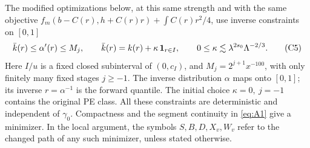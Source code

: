 The modified optimizations below, at this same strength and with the same objective \(f_m(b-C(r),h+C(r)r)+\int C(r)r^2/4\), use inverse constraints on \([0,1]\)
\[
 \bar k(r)\le\alpha'(r)\le M_j,\qquad
 \bar k(r)=k(r)+\kappa\,{\bf1}_{r\in I},\qquad
 0\le\kappa\lesssim\lambda^{2s_0}\Lambda^{-2/3}.                        \tag{C5}\label{eq:C5}
\]
Here \(I/u\) is a fixed closed subinterval of \((0,c_I)\), and
\(M_j=2^{j+1}x^{-100}\), with only finitely many fixed stages
\(j\ge-1\). The inverse distribution \(\alpha\) maps onto \([0,1]\);
its inverse \(r=\alpha^{-1}\) is the forward quantile. The initial
choice \(\kappa=0,\ j=-1\) contains the original PE class.
All these constraints are deterministic and independent of
\(\gamma_0\). Compactness and the segment continuity in
\eqref{eq:A1} give a minimizer. In the local argument, the symbols
\(S,B,D,X_v,W_v\) refer to the changed path of any such minimizer,
unless stated otherwise.

